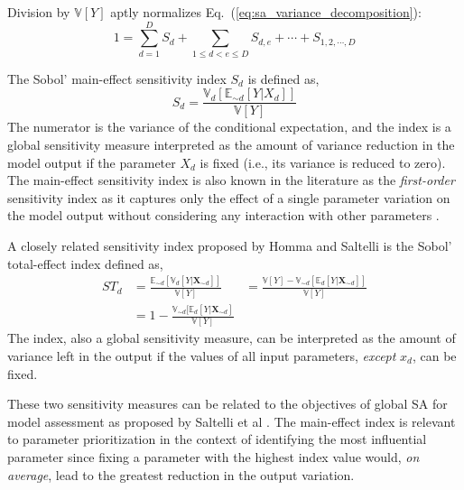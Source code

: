 Division by $\mathbb{V}[Y]$ aptly normalizes Eq.~(\ref{eq:sa_variance_decomposition}):
\begin{equation}
  1 = \sum_{d = 1}^{D} S_d + \sum_{1 \leq d < e \leq D} S_{d,e} + \cdots + S_{1,2,\cdots,D}
\label{eq:sa_normalized_variance}
\end{equation}

The Sobol' main-effect sensitivity index $S_d$ is defined as,
\begin{equation}
  S_d = \frac{\mathbb{V}_d [\mathbb{E}_{\sim d} [Y|X_d]]}{\mathbb{V}[Y]}
\label{eq:sa_main_effect_index}
\end{equation}
The numerator is the variance of the conditional expectation,
and the index is a global sensitivity measure interpreted as the amount of variance reduction in the model output if the parameter $X_d$ is fixed (i.e., its variance is reduced to zero).
The main-effect sensitivity index is also known in the literature as the \emph{first-order} sensitivity index 
as it captures only the effect of a single parameter variation on the model output without considering any interaction with other parameters \cite{Saltelli2002}.

A closely related sensitivity index proposed by Homma and Saltelli \cite{Homma1996} is the Sobol' total-effect index defined as,
\begin{equation}
  \begin{split}
    ST_{d} & = \frac{\mathbb{E}_{\sim d}[\mathbb{V}_{d}[Y|\mathbf{X}_{\sim d}]]}{\mathbb{V}[Y]}
           & = \frac{\mathbb{V}[Y] - \mathbb{V}_{\sim d}\left[\mathbb{E}_{d}\left[Y|\mathbf{X}_{\sim d}\right]\right]}{\mathbb{V}[Y]} \\
           & = 1 - \frac{\mathbb{V}_{\sim d}[\mathbb{E}_{d}[Y|\mathbf{X}_{\sim d}]}{\mathbb{V}[Y]}
  \end{split}
\label{eq:sa_total_effect_index}
\end{equation}
The index, also a global sensitivity measure, can be interpreted as the amount of variance left in the output if the values of all input parameters, 
\emph{except} $x_d$, can be fixed.

These two sensitivity measures can be related to the objectives of global SA for model assessment as proposed by Saltelli et al \cite{Saltelli2004,Saltelli2008}.
The main-effect index is relevant to parameter prioritization in the context of identifying the most influential parameter 
since fixing a parameter with the highest index value would, \emph{on average}, lead to 
the greatest reduction in the output variation.

